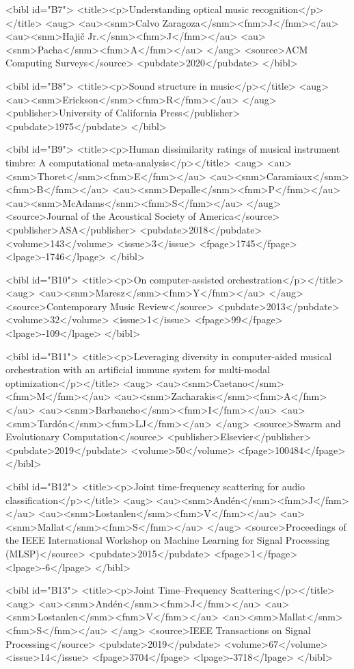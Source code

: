 \documentclass{bmcart}
\begin{document}
\begin{backmatter}
{<bibl id="B7">
  <title><p>Understanding optical music recognition</p></title>
  <aug>
    <au><snm>Calvo Zaragoza</snm><fnm>J</fnm></au>
    <au><snm>Haji\v{c} Jr.</snm><fnm>J</fnm></au>
    <au><snm>Pacha</snm><fnm>A</fnm></au>
  </aug>
  <source>ACM Computing Surveys</source>
  <pubdate>2020</pubdate>
</bibl>

<bibl id="B8">
  <title><p>Sound structure in music</p></title>
  <aug>
    <au><snm>Erickson</snm><fnm>R</fnm></au>
  </aug>
  <publisher>University of California Press</publisher>
  <pubdate>1975</pubdate>
</bibl>

<bibl id="B9">
  <title><p>Human dissimilarity ratings of musical instrument timbre: A
  computational meta-analysis</p></title>
  <aug>
    <au><snm>Thoret</snm><fnm>E</fnm></au>
    <au><snm>Caramiaux</snm><fnm>B</fnm></au>
    <au><snm>Depalle</snm><fnm>P</fnm></au>
    <au><snm>McAdams</snm><fnm>S</fnm></au>
  </aug>
  <source>Journal of the Acoustical Society of America</source>
  <publisher>ASA</publisher>
  <pubdate>2018</pubdate>
  <volume>143</volume>
  <issue>3</issue>
  <fpage>1745</fpage>
  <lpage>-1746</lpage>
</bibl>

<bibl id="B10">
  <title><p>On computer-assisted orchestration</p></title>
  <aug>
    <au><snm>Maresz</snm><fnm>Y</fnm></au>
  </aug>
  <source>Contemporary Music Review</source>
  <pubdate>2013</pubdate>
  <volume>32</volume>
  <issue>1</issue>
  <fpage>99</fpage>
  <lpage>-109</lpage>
</bibl>

<bibl id="B11">
  <title><p>Leveraging diversity in computer-aided musical orchestration with
  an artificial immune system for multi-modal optimization</p></title>
  <aug>
    <au><snm>Caetano</snm><fnm>M</fnm></au>
    <au><snm>Zacharakis</snm><fnm>A</fnm></au>
    <au><snm>Barbancho</snm><fnm>I</fnm></au>
    <au><snm>Tard{\'o}n</snm><fnm>LJ</fnm></au>
  </aug>
  <source>Swarm and Evolutionary Computation</source>
  <publisher>Elsevier</publisher>
  <pubdate>2019</pubdate>
  <volume>50</volume>
  <fpage>100484</fpage>
</bibl>

<bibl id="B12">
  <title><p>Joint time-frequency scattering for audio
  classification</p></title>
  <aug>
    <au><snm>And{\'e}n</snm><fnm>J</fnm></au>
    <au><snm>Lostanlen</snm><fnm>V</fnm></au>
    <au><snm>Mallat</snm><fnm>S</fnm></au>
  </aug>
  <source>Proceedings of the IEEE International Workshop on Machine Learning
  for Signal Processing (MLSP)</source>
  <pubdate>2015</pubdate>
  <fpage>1</fpage>
  <lpage>-6</lpage>
</bibl>

<bibl id="B13">
  <title><p>Joint Time--Frequency Scattering</p></title>
  <aug>
    <au><snm>And\'{e}n</snm><fnm>J</fnm></au>
    <au><snm>Lostanlen</snm><fnm>V</fnm></au>
    <au><snm>Mallat</snm><fnm>S</fnm></au>
  </aug>
  <source>IEEE Transactions on Signal Processing</source>
  <pubdate>2019</pubdate>
  <volume>67</volume>
  <issue>14</issue>
  <fpage>3704</fpage>
  <lpage>-3718</lpage>
</bibl>

}
\end{backmatter}
\end{document}
